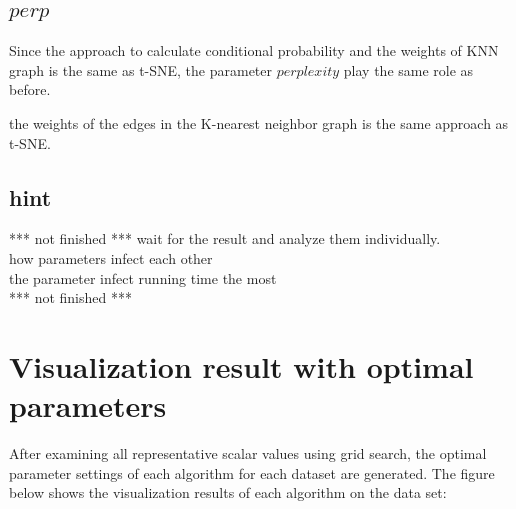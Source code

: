 \subsection{$perp$}

Since the approach to calculate conditional probability and the weights of KNN graph is the same as t-SNE, the parameter $perplexity$ play the same role as before. 

the weights of the edges in the K-nearest neighbor
graph is the same approach as t-SNE.



\subsection{hint}

*** not finished ***
wait for the result and analyze them individually.\\
how parameters infect each other\\
the parameter infect running time the most\\
*** not finished ***

\section{Visualization result with optimal parameters}

After examining all representative scalar values using grid search, the optimal parameter settings of each algorithm for each dataset are generated. The figure below shows the visualization results of each algorithm on the data set:


